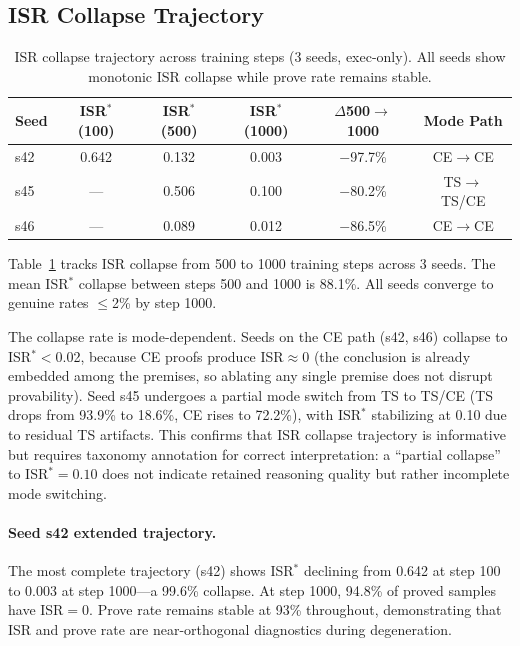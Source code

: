 \documentclass[11pt,a4paper]{article}
\begin{document}
\subsection{ISR Collapse Trajectory}
\label{sec:trajectory}

\begin{table}[t]
\centering
\caption{ISR collapse trajectory across training steps (3 seeds, exec-only). All seeds show monotonic ISR collapse while prove rate remains stable.}
\label{tab:isr-trajectory}
\small
\begin{tabular}{lccccc}
\toprule
Seed & ISR$^*$(100) & ISR$^*$(500) & ISR$^*$(1000) & $\Delta$500$\to$1000 & Mode Path \\
\midrule
s42 & 0.642 & 0.132 & 0.003 & $-$97.7\% & CE$\to$CE \\
s45 & --- & 0.506 & 0.100 & $-$80.2\% & TS$\to$TS/CE \\
s46 & --- & 0.089 & 0.012 & $-$86.5\% & CE$\to$CE \\
\bottomrule
\end{tabular}
\end{table}

Table~\ref{tab:isr-trajectory} tracks ISR collapse from 500 to 1000 training steps across 3 seeds.
The mean ISR$^*$ collapse between steps 500 and 1000 is 88.1\%.
All seeds converge to genuine rates $\leq$2\% by step 1000.

The collapse rate is mode-dependent.
Seeds on the CE path (s42, s46) collapse to ISR$^*<$0.02, because CE proofs produce ISR$\approx$0 (the conclusion is already embedded among the premises, so ablating any single premise does not disrupt provability).
Seed s45 undergoes a partial mode switch from TS to TS/CE (TS drops from 93.9\% to 18.6\%, CE rises to 72.2\%), with ISR$^*$ stabilizing at 0.10 due to residual TS artifacts.
This confirms that ISR collapse trajectory is informative but requires taxonomy annotation for correct interpretation: a ``partial collapse'' to ISR$^*=0.10$ does not indicate retained reasoning quality but rather incomplete mode switching.

\paragraph{Seed s42 extended trajectory.}
The most complete trajectory (s42) shows ISR$^*$ declining from 0.642 at step 100 to 0.003 at step 1000---a 99.6\% collapse.
At step 1000, 94.8\% of proved samples have ISR$=$0.
Prove rate remains stable at 93\% throughout, demonstrating that ISR and prove rate are near-orthogonal diagnostics during degeneration.
\end{document}
